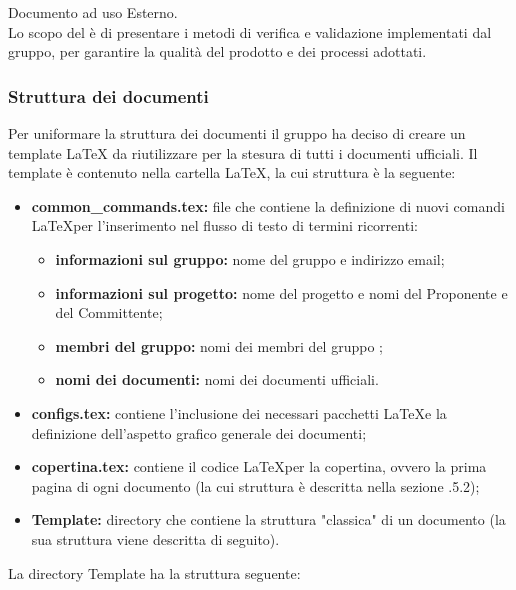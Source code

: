       \subsubsubsection{\PdQ{}}
        Documento ad uso Esterno.\\
        Lo scopo del \textit{\PdQ{}} è di presentare i metodi di verifica e validazione implementati dal gruppo, per garantire la qualità del prodotto e dei processi adottati.

    \subsubsection{Struttura dei documenti}
        Per uniformare la struttura dei documenti il gruppo ha deciso di creare un template \LaTeX{} da riutilizzare per la stesura di tutti i documenti ufficiali. Il template è contenuto nella cartella \LaTeX{}, la cui struttura è la seguente:
        \begin{itemize}
          \item \textbf{common\_commands.tex:} file che contiene la definizione di nuovi comandi \LaTeX per l'inserimento nel flusso di testo di termini ricorrenti:
            \begin{itemize}
              \item \textbf{informazioni sul gruppo:} nome del gruppo e indirizzo email;
              \item \textbf{informazioni sul progetto:} nome del progetto e nomi del Proponente e del Committente;
              \item \textbf{membri del gruppo:} nomi dei membri del gruppo \Gruppo;
              \item \textbf{nomi dei documenti:} nomi dei documenti ufficiali.
            \end{itemize}
          \item \textbf{configs.tex:} contiene l'inclusione dei necessari pacchetti \LaTeX e la definizione dell'aspetto grafico generale dei documenti;
          \item \textbf{copertina.tex:} contiene il codice \LaTeX per la copertina, ovvero la prima pagina di ogni documento (la cui struttura è descritta nella sezione .5.2);
          \item \textbf{Template:} directory che contiene la struttura "classica" di un documento (la sua struttura viene descritta di seguito).
        \end{itemize}
        La directory Template ha la struttura seguente:
